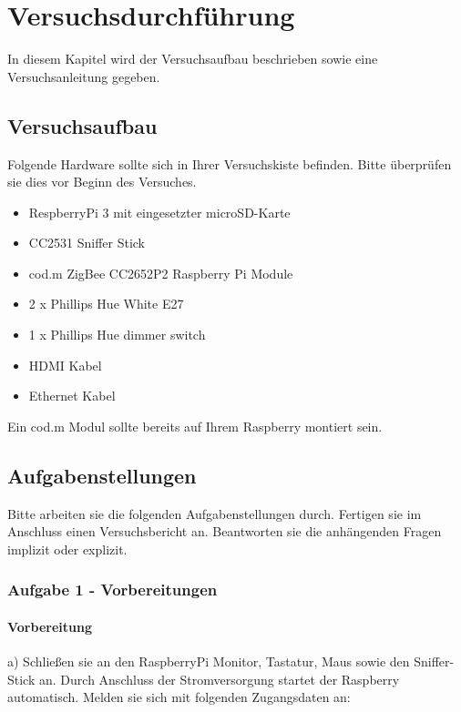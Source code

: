 \chapter{Versuchsdurchführung}

In diesem Kapitel wird der Versuchsaufbau beschrieben sowie eine Versuchsanleitung gegeben.

\section{Versuchsaufbau}

Folgende Hardware sollte sich in Ihrer Versuchskiste befinden. Bitte überprüfen sie dies vor Beginn des Versuches.

\begin{itemize}
    \item RespberryPi 3 mit eingesetzter microSD-Karte
    \item CC2531 Sniffer Stick
    \item cod.m ZigBee CC2652P2 Raspberry Pi Module
    \item 2 x Phillips Hue White E27
    \item 1 x Phillips Hue dimmer switch
    \item HDMI Kabel
    \item Ethernet Kabel
\end{itemize}

Ein cod.m Modul sollte bereits auf Ihrem Raspberry montiert sein. 

\section{Aufgabenstellungen}

Bitte arbeiten sie die folgenden Aufgabenstellungen durch. Fertigen sie im Anschluss einen Versuchsbericht an. Beantworten sie die anhängenden Fragen
implizit oder explizit.

\subsection{Aufgabe 1 - Vorbereitungen}

\subsubsection{Vorbereitung}
a) Schließen sie an den RaspberryPi Monitor, Tastatur, Maus sowie den Sniffer-Stick an. Durch Anschluss der
Stromversorgung startet der Raspberry automatisch. Melden sie sich mit folgenden Zugangsdaten an:


